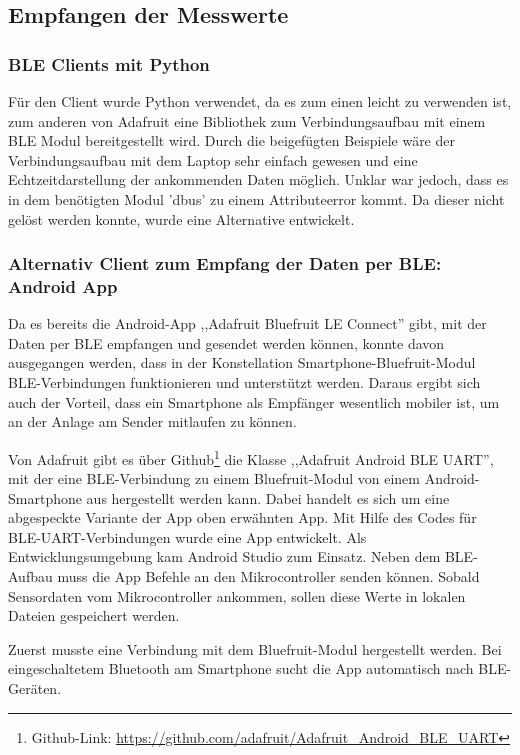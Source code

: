 \subsection{Empfangen der Messwerte}
 
\subsubsection{BLE Clients mit Python}
Für den Client wurde Python verwendet, da es zum einen leicht zu verwenden ist, zum anderen von Adafruit eine Bibliothek zum Verbindungsaufbau mit einem BLE Modul bereitgestellt wird. Durch die beigefügten Beispiele wäre der Verbindungsaufbau mit dem Laptop sehr einfach gewesen und eine Echtzeitdarstellung der ankommenden Daten möglich. Unklar war jedoch, dass es in dem benötigten Modul 'dbus' zu einem Attributeerror kommt. Da dieser nicht gelöst werden konnte, wurde eine Alternative entwickelt.

\subsubsection{Alternativ Client zum Empfang der Daten per BLE: Android App}
\label{AndroidAppFürDatenmessen}
Da es bereits die Android-App ,,Adafruit Bluefruit LE Connect'' gibt, mit der Daten per BLE empfangen und gesendet werden können, konnte davon ausgegangen werden, dass in der Konstellation Smartphone-Bluefruit-Modul BLE-Verbindungen funktionieren und unterstützt werden. Daraus ergibt sich auch der Vorteil, dass ein Smartphone als Empfänger wesentlich mobiler ist, um an der Anlage am Sender mitlaufen zu können. 

Von Adafruit gibt es über Github\footnote{Github-Link: \url{https://github.com/adafruit/Adafruit_Android_BLE_UART}} die Klasse ,,Adafruit Android BLE UART'', mit der eine BLE-Verbindung zu einem Bluefruit-Modul von einem Android-Smartphone aus hergestellt werden kann. Dabei handelt es sich um eine abgespeckte Variante der App oben erwähnten App. Mit Hilfe des Codes für BLE-UART-Verbindungen wurde eine App entwickelt. Als Entwicklungsumgebung kam Android Studio zum Einsatz. Neben dem BLE-Aufbau muss die App Befehle an den Mikrocontroller senden können. Sobald Sensordaten vom Mikrocontroller ankommen, sollen diese Werte in lokalen Dateien gespeichert werden.

Zuerst musste eine Verbindung mit dem Bluefruit-Modul hergestellt werden. Bei eingeschaltetem Bluetooth am Smartphone sucht die App automatisch nach BLE-Geräten. 

